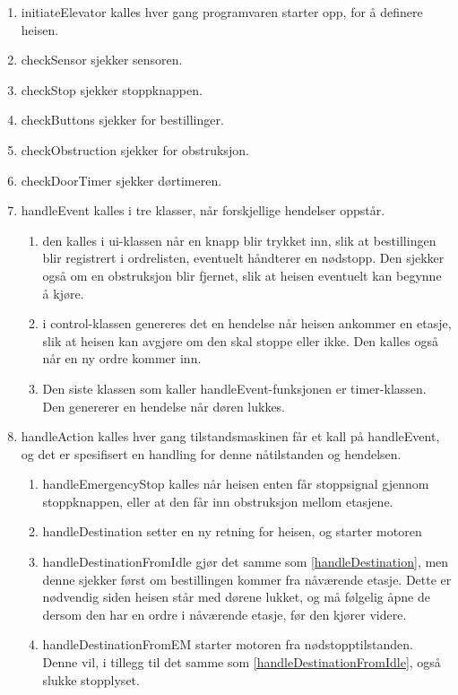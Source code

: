 \begin{enumerate}
\item initiateElevator kalles hver gang programvaren starter opp, for å definere heisen.
\item checkSensor sjekker sensoren.
\item checkStop sjekker stoppknappen.
\item checkButtons sjekker for bestillinger.
\item checkObstruction sjekker for obstruksjon.
\item checkDoorTimer sjekker dørtimeren.
\item handleEvent kalles i tre klasser, når forskjellige hendelser oppstår.
	\begin{enumerate}
	\item den kalles i ui-klassen når en knapp blir trykket inn, slik at bestillingen blir registrert i ordrelisten, eventuelt håndterer en nødstopp. Den sjekker også om en obstruksjon blir fjernet, slik at heisen eventuelt kan begynne å kjøre.
	\item i control-klassen genereres det en hendelse når  heisen ankommer en etasje, slik at heisen kan avgjøre om den skal stoppe eller ikke. Den kalles også når en ny ordre kommer inn.
	\item Den siste klassen som kaller handleEvent-funksjonen er timer-klassen. Den genererer en hendelse når døren lukkes. 
	\end{enumerate}
\item handleAction kalles hver gang tilstandsmaskinen får et kall på handleEvent, og det er spesifisert en handling for denne nåtilstanden og hendelsen.
	\begin{enumerate}
	\item handleEmergencyStop kalles når heisen enten får stoppsignal gjennom stoppknappen, eller at den får inn obstruksjon mellom etasjene.
	\item \label{handleDestination} handleDestination setter en ny retning for heisen, og starter motoren
	\item \label{handleDestinationFromIdle} handleDestinationFromIdle gjør det samme som \ref{handleDestination}, men denne sjekker først om bestillingen kommer fra nåværende etasje. Dette er nødvendig siden heisen står med dørene lukket, og må følgelig åpne de dersom den har en ordre i nåværende etasje, før den kjører videre.
	\item handleDestinationFromEM starter motoren fra nødstopptilstanden. Denne vil, i tillegg til det samme som \ref{handleDestinationFromIdle}, også slukke stopplyset.

\end{enumerate}
\end{enumerate}
